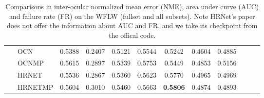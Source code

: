 \documentclass[journal,transmag]{IEEEtran}
\begin{document}
\begin{table}[t]
\begin{center}
{\begin{tabular}{|c|l|c|c|c|c|c|c|c|c|c|c|}
\cline{2-9}\cline{2-9}
~& OCN & 0.5388 & 0.2407 & 0.5121 & 0.5544 & 0.5242 & 0.4604 & 0.4885 \\
~& OCNMP & 0.5615 & 0.2897 & 0.5339 & 0.5753 & 0.5449 & 0.4853 & 0.5156 \\
~& HRNET & 0.5536 & 0.2867& 0.5360 & 0.5623 & 0.5770 & 0.4965 &  0.4969 \\
~& HRNETMP & 0.5604 & 0.3010 & 0.5460 & 0.5663 & {\bf 0.5806} & 0.4874 &  0.4893 \\
\hline


\end{tabular}
}
\end{center}
\caption{Comparisons in inter-ocular normalized mean error (NME), area under curve (AUC) and failure rate (FR) on the WFLW (fullset and all subsets). Note HRNet's paper does not offer the information about AUC and FR, and we take its checkpoint from the offical code.}
\label{tab1_WFLW}
\end{table}
\end{document}
